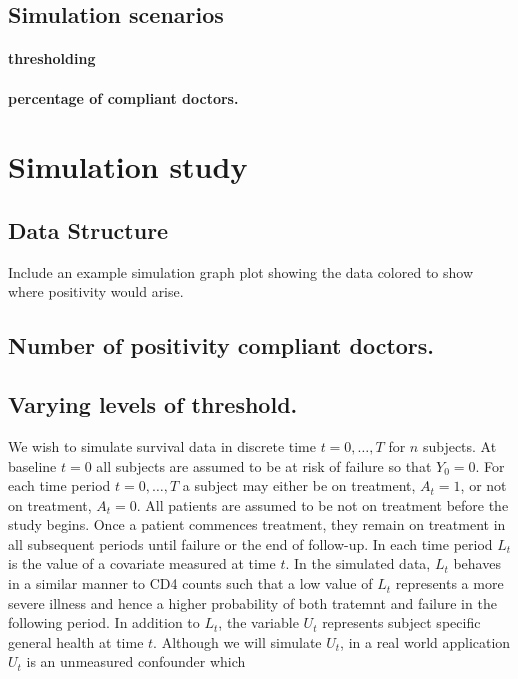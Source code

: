 \documentclass[11pt]{article}
\begin{document}
\subsection{Simulation scenarios}\label{simulation-scenarios}

\paragraph{thresholding}\label{thresholding}

\paragraph{percentage of compliant
doctors.}\label{percentage-of-compliant-doctors.}

    \section{Simulation study}\label{simulation-study}

\subsection{Data Structure}\label{data-structure}

Include an example simulation graph plot showing the data colored to
show where positivity would arise.

\subsection{Number of positivity compliant
doctors.}\label{number-of-positivity-compliant-doctors.}

\subsection{Varying levels of
threshold.}\label{varying-levels-of-threshold.}

We wish to simulate survival data in discrete time \(t = 0, \dots, T\)
for \(n\) subjects. At baseline \(t=0\) all subjects are assumed to be
at risk of failure so that \(Y_0 = 0\). For each time period
\(t = 0, \dots, T\) a subject may either be on treatment, \(A_t = 1\),
or not on treatment, \(A_t = 0\). All patients are assumed to be not on
treatment before the study begins. Once a patient commences treatment,
they remain on treatment in all subsequent periods until failure or the
end of follow-up. In each time period \(L_t\) is the value of a
covariate measured at time \(t\). In the simulated data, \(L_t\) behaves
in a similar manner to CD4 counts such that a low value of \(L_t\)
represents a more severe illness and hence a higher probability of both
tratemnt and failure in the following period. In addition to \(L_t\),
the variable \(U_t\) represents subject specific general health at time
\(t\). Although we will simulate \(U_t\), in a real world application
\(U_t\) is an unmeasured confounder which
\end{document}
